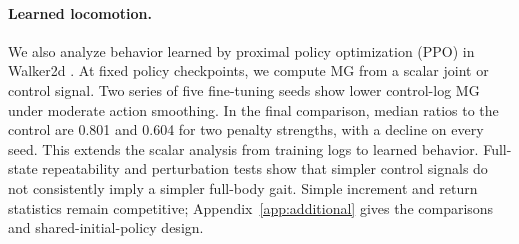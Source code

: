 {\paragraph{Learned locomotion.}
We also analyze behavior learned by proximal policy optimization (PPO) in Walker2d \citep{schulman2017proximal,todorov2012mujoco}. At fixed policy checkpoints, we compute MG from a scalar joint or control signal. Two series of five fine-tuning seeds show lower control-log MG under moderate action smoothing. In the final comparison, median ratios to the control are 0.801 and 0.604 for two penalty strengths, with a decline on every seed. This extends the scalar analysis from training logs to learned behavior. Full-state repeatability and perturbation tests show that simpler control signals do not consistently imply a simpler full-body gait. Simple increment and return statistics remain competitive; Appendix~\ref{app:additional} gives the comparisons and shared-initial-policy design.
}
